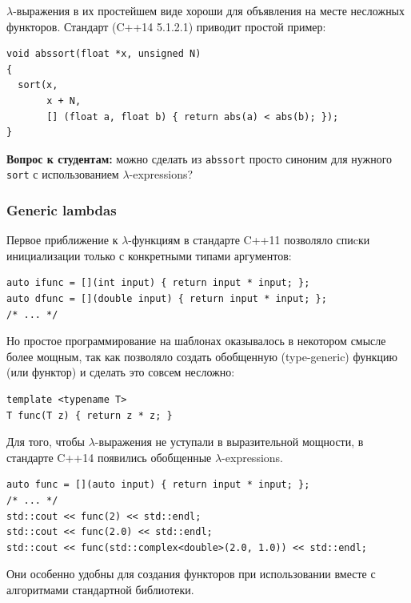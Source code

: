 \documentclass[a4paper,12pt,oneside]{article}
\newif\ifanswers
\begin{document}
$\lambda$-выражения в их простейшем виде хороши для объявления на месте несложных функторов. Стандарт (C++14 5.1.2.1) приводит простой пример:

\begin{lstlisting}
void abssort(float *x, unsigned N)
{
  sort(x, 
       x + N,
       [] (float a, float b) { return abs(a) < abs(b); });
}
\end{lstlisting}

\textbf{Вопрос к студентам:} можно сделать из \lstinline!abssort! просто синоним для нужного \lstinline!sort! с использованием $\lambda$-expressions?

\ifanswers
Правильный ответ: конечно и несложно \lstinline!auto abssort = [] (float *x, unsigned N) { /* ... */ }! тело то же самое
\fi

\subsubsection{Generic lambdas}\label{GenericLambdas}

Первое приближение к $\lambda$-функциям в стандарте C++11 позволяло спиcки инициализации только с конкретными типами аргументов:

\begin{lstlisting}
auto ifunc = [](int input) { return input * input; };
auto dfunc = [](double input) { return input * input; };
/* ... */
\end{lstlisting}

Но простое программирование на шаблонах оказывалось в некотором смысле более мощным, так как позволяло создать обобщенную (type-generic) функцию (или функтор) и сделать это совсем несложно:

\begin{lstlisting}
template <typename T>
T func(T z) { return z * z; }
\end{lstlisting}

Для того, чтобы $\lambda$-выражения не уступали в выразительной мощности, в стандарте C++14 появились обобщенные $\lambda$-expressions.

\begin{lstlisting}
auto func = [](auto input) { return input * input; };
/* ... */
std::cout << func(2) << std::endl;
std::cout << func(2.0) << std::endl;
std::cout << func(std::complex<double>(2.0, 1.0)) << std::endl;
\end{lstlisting}

Они особенно удобны для создания функторов при использовании вместе с алгоритмами стандартной библиотеки.
\end{document}
